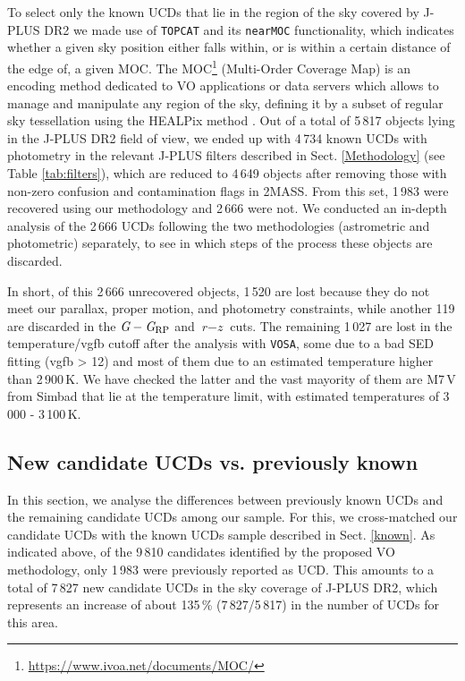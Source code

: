 To select only the known UCDs that lie in the region of the sky covered by J-PLUS DR2 we made use of \texttt{TOPCAT} and its \texttt{nearMOC} functionality, which indicates whether a given sky position either falls within, or is within a certain distance of the edge of, a given MOC. The MOC\footnote{\url{https://www.ivoa.net/documents/MOC/}} (Multi-Order Coverage Map) is an encoding method dedicated to VO applications or data servers which allows to manage and manipulate any region of the sky, defining it by a subset of regular sky tessellation using the HEALPix method \citep{healpix}. Out of a total of 5\,817 objects lying in the J-PLUS DR2 field of view, we ended up with 4\,734 known UCDs with photometry in the relevant J-PLUS filters described in Sect. \ref{Methodology} (see Table \ref{tab:filters}), which are reduced to 4\,649 objects after removing those with non-zero confusion and contamination flags in 2MASS. From this set, 1\,983 were recovered using our methodology and 2\,666 were not. We conducted an in-depth analysis of the 2\,666 UCDs following the two methodologies (astrometric and photometric) separately, to see in which steps of the process these objects are discarded.

In short, of this 2\,666 unrecovered objects, 1\,520 are lost because they do not meet our parallax, proper motion, and photometry constraints, while another 119 are discarded in the $\textit{G} - \textit{G}_{\rm RP}$ and $\textit{r} - \textit{z}$ cuts. The remaining 1\,027 are lost in the temperature/vgfb cutoff after the analysis with \texttt{VOSA}, some due to a bad SED fitting (vgfb > 12) and most of them due to an estimated temperature higher than 2\,900\,K. We have checked the latter and the vast mayority of them are M7\,V from Simbad that lie at the temperature limit, with estimated temperatures of 3\,000 - 3\,100\,K.


\subsection{New candidate UCDs vs. previously known} \label{new_vs_known}

In this section, we analyse the differences between previously known UCDs and the remaining candidate UCDs among our sample. For this, we cross-matched our candidate UCDs with the known UCDs sample described in Sect. \ref{known}. As indicated above, of the 9\,810 candidates identified by the proposed VO methodology, only 1\,983 were previously reported as UCD. This amounts to a total of 7\,827 new candidate UCDs in the sky coverage of J-PLUS DR2, which represents an increase of about 135\,\% (7\,827/5\,817) in the number of UCDs for this area.

